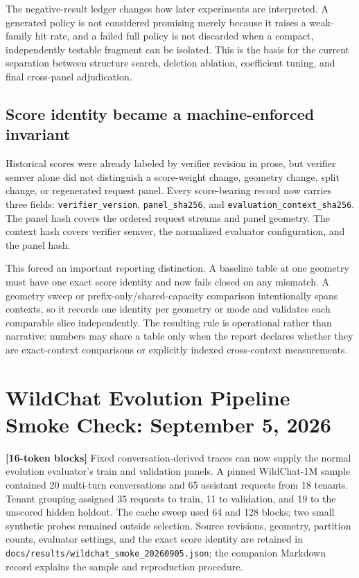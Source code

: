 \documentclass[11pt]{article}
\newcommand{\filepath}[1]{\nolinkurl{#1}}
\newcommand{\identifier}[1]{\nolinkurl{#1}}
\newcommand{\blocktag}[1]{\textbf{\color{navy}[#1-token blocks]}}
\begin{document}
The negative-result ledger changes how later experiments are interpreted.  A generated
policy is not considered promising merely because it raises a weak-family hit rate, and
a failed full policy is not discarded when a compact, independently testable fragment
can be isolated.  This is the basis for the current separation between structure
search, deletion ablation, coefficient tuning, and final cross-panel adjudication.

\subsection{Score identity became a machine-enforced invariant}

Historical scores were already labeled by verifier revision in prose, but verifier
semver alone did not distinguish a score-weight change, geometry change, split change,
or regenerated request panel.  Every score-bearing record now carries three fields:
\identifier{verifier\_version}, \identifier{panel\_sha256}, and
\identifier{evaluation\_context\_sha256}.  The panel hash covers the ordered request
streams and panel geometry.  The context hash covers verifier semver, the normalized
evaluator configuration, and the panel hash.

This forced an important reporting distinction.  A baseline table at one geometry must
have one exact score identity and now fails closed on any mismatch.  A geometry sweep
or prefix-only/shared-capacity comparison intentionally spans contexts, so it records
one identity per geometry or mode and validates each comparable slice independently.
The resulting rule is operational rather than narrative: numbers may share a table only
when the report declares whether they are exact-context comparisons or explicitly
indexed cross-context measurements.

\section{WildChat Evolution Pipeline Smoke Check: September 5, 2026}

\blocktag{16} Fixed conversation-derived traces can now supply the normal
evolution evaluator's train and validation panels.  A pinned WildChat-1M sample
contained 20 multi-turn conversations and 65 assistant requests from 18 tenants.
Tenant grouping assigned 35 requests to train, 11 to validation, and 19 to the
unscored hidden holdout.  The cache sweep used 64 and 128 blocks; two small
synthetic probes remained outside selection.  Source revisions, geometry,
partition counts, evaluator settings, and the exact score identity are retained
in \filepath{docs/results/wildchat_smoke_20260905.json}; the companion Markdown
record explains the sample and reproduction procedure.
\end{document}
